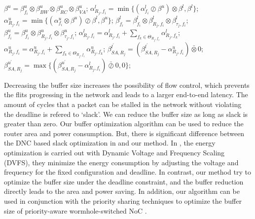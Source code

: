 \documentclass[10pt,journal]{IEEEtran}
\begin{document}
\begin{algorithm}
\begin{algorithmic}[1]
            \STATE $\beta^u=\beta^u_{f_i}\otimes\beta_{BW}^u\otimes\beta_{RC}^u\otimes\beta_{VA}^u$;
            \STATE $\alpha^l_{R_j,f_i}=\min\{(\alpha^l_{f_i}\oslash\beta^u)\otimes\beta^l,\beta^l\}$;
            \STATE $\alpha^u_{R_j,f_i}=\min\{(\alpha^u_{f_i}\otimes\beta^u)\oslash\beta^l,\beta^u\}$;
            \STATE $\beta_{f_i}^l=\beta_{f_i}^l\otimes\beta_{R_j,f_i}^l\otimes\beta_{\tau_j,f_i}^l$;
            \STATE $\beta_{f_i}^u=\beta_{f_i}^u\otimes\beta_{R_j,f_i}^u\otimes\beta_{\tau_j,f_i}^u$;
                    \STATE $\alpha^l_{R_j,f_i}=\alpha^l_{R_j,f_i}+\sum_{f_k\in\Theta_{R_j,f_i}}\alpha^l_{R_j,f_k}$;
                    \STATE $\alpha^u_{R_j,f_i}=\alpha^u_{R_j,f_i}+\sum_{f_k\in\Theta_{R_j,f_i}}\alpha^u_{R_j,f_k}$;
                \ENDIF
                \STATE $\beta^{l^\prime}_{SA,R_j}=(\beta^{l^\prime}_{SA,R_j}-\alpha^u_{R_j,f_i})\bar{\otimes}0$;
                \STATE $\beta^{u^\prime}_{SA,R_j}=\max\{(\beta^{u^\prime}_{SA, R_j}-\alpha^l_{R_j,f_i})\bar{\oslash}0,0\}$;
            \ENDIF
        \ENDFOR
    \ENDFOR
\end{algorithmic}
\end{algorithm}

Decreasing the buffer size increases the possibility of flow control, which prevents the flits progressing in the network and leads to a larger end-to-end latency. The amount of cycles that a packet can be stalled in the network without violating the deadline is refered to `slack'. We can reduce the buffer size as long as slack is greater than zero. Our buffer optimization algorithm can be used to reduce the router area and power consumption. But, there is significant difference between the DNC based slack optimization in \cite{6560630} and our method. In \cite{6560630}, the energy optimization is carried out with Dynamic Voltage and Frequency Scaling (DVFS), they minimize the energy consumption by adjusting the voltage and frequency for the fixed configuration and deadline. In contrast, our method try to optimize the buffer size under the deadline constraint, and the buffer reduction directly leads to the area and power saving. In addition, our algorithm can be used in conjunction with the priority sharing techniques \cite{5161497} to optimize the buffer size of priority-aware wormhole-switched NoC .
\end{document}
